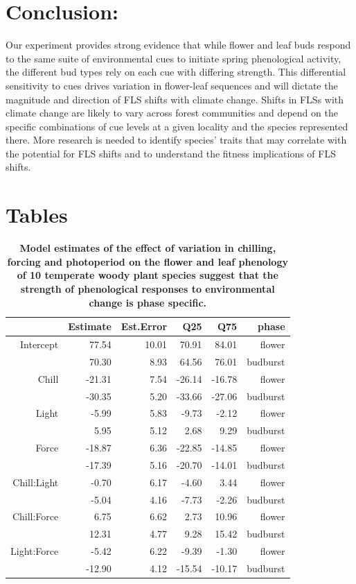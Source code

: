 \documentclass[11pt]{article}
\begin{document}
\section*{Conclusion:}
\noindent Our experiment provides strong evidence that while flower and leaf buds respond to the same suite of environmental cues to initiate spring phenological activity, the different bud types rely on each cue with differing strength. This differential sensitivity to cues drives variation in flower-leaf sequences and will dictate the magnitude and direction of FLS shifts with climate change. Shifts in FLSs with climate change are likely to vary across forest communities and depend on the specific combinations of cue levels at a given locality and the species represented there. More research is needed to identify species' traits that may correlate with the potential for FLS shifts and to understand the fitness implications of FLS shifts.

 

\section*{Tables}
\begin{table}[ht]
\centering
\begin{tabular}{|r|r|r|r|r|r|}
  \hline
 & Estimate & Est.Error & Q25 & Q75 & phase \\ 
  \hline
Intercept & 77.54 & 10.01 & 70.91 & 84.01 & flower \\ 
 & 70.30 & 8.93 & 64.56 & 76.01 & budburst \\ 
  \hline
  Chill & -21.31 & 7.54 & -26.14 & -16.78 & flower\\ 
   & -30.35 & 5.20 & -33.66 & -27.06 & budburst\\ 
 \hline
  Light & -5.99 & 5.83 & -9.73 & -2.12 & flower\\ 
   & 5.95 & 5.12 & 2.68 & 9.29 & budburst\\ 
  \hline
  Force & -18.87 & 6.36 & -22.85 & -14.85 & flower\\ 
 & -17.39 & 5.16 & -20.70 & -14.01 & budburst \\ 
  \hline
  Chill:Light & -0.70 & 6.17 & -4.60 & 3.44 & flower\\ 
     & -5.04 & 4.16 & -7.73 & -2.26 & budburst\\ 
  \hline
  Chill:Force & 6.75 & 6.62 & 2.73 & 10.96 & flower \\ 
   & 12.31 & 4.77 & 9.28 & 15.42 & budburst \\ 
  \hline
  Light:Force & -5.42 & 6.22 & -9.39 & -1.30 & flower \\ 
    & -12.90 & 4.12 & -15.54 & -10.17 & budburst\\ 
   \hline
\end{tabular}
\label{tab:modelests}
\caption{\textbf{Model estimates of the effect of variation in chilling, forcing and photoperiod on the flower and leaf phenology of 10 temperate woody plant species suggest that the strength of phenological responses to environmental change is phase specific.} }
\end{table}
\end{document}

